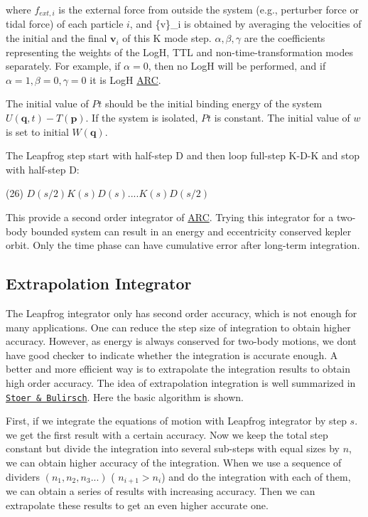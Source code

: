 where $ f_{ext,i} $ is the external force from outside the system (e.\+g., perturber force or tidal force) of each particle $ i$, and  \{v\}\+\_\+i  is obtained by averaging the velocities of the initial and the final $ \mathbf{v}_i $ of this K mode step. $ \alpha, \beta, \gamma $ are the coefficients representing the weights of the LogH, T\+TL and non-\/time-\/transformation modes separately. For example, if $ \alpha=0$, then no LogH will be performed, and if $ \alpha =1, \beta=0, \gamma=0 $ it is LogH \hyperlink{namespaceARC}{A\+RC}.

The initial value of $ Pt $ should be the initial binding energy of the system $ U(\mathbf{q},t) - T(\mathbf{p}) $. If the system is isolated, $ Pt $ is constant. The initial value of $ w$ is set to initial $ W(\mathbf{q}) $.

The Leapfrog step start with half-\/step D and then loop full-\/step K-\/\+D-\/K and stop with half-\/step D\+:

(26) $ D(s/2)K(s)D(s)....K(s)D(s/2) $

This provide a second order integrator of \hyperlink{namespaceARC}{A\+RC}. Trying this integrator for a two-\/body bounded system can result in an energy and eccentricity conserved kepler orbit. Only the time phase can have cumulative error after long-\/term integration.\hypertarget{index_extrapolation_sec}{}\subsection{Extrapolation Integrator}\label{index_extrapolation_sec}
The Leapfrog integrator only has second order accuracy, which is not enough for many applications. One can reduce the step size of integration to obtain higher accuracy. However, as energy is always conserved for two-\/body motions, we don\textquotesingle{}t have good checker to indicate whether the integration is accurate enough. A better and more efficient way is to extrapolate the integration results to obtain high order accuracy. The idea of extrapolation integration is well summarized in \href{http://link.springer.com/book/10.1007%2F978-0-387-21738-3}{\tt Stoer \& Bulirsch}. Here the basic algorithm is shown.

First, if we integrate the equations of motion with Leapfrog integrator by step $ s$. we get the first result with a certain accuracy. Now we keep the total step constant but divide the integration into several sub-\/steps with equal sizes by $ n $, we can obtain higher accuracy of the integration. When we use a sequence of dividers $ (n_1, n_2, n_3 ...)$ ( $ n_{i+1}>n_i$) and do the integration with each of them, we can obtain a series of results with increasing accuracy. Then we can extrapolate these results to get an even higher accurate one.

